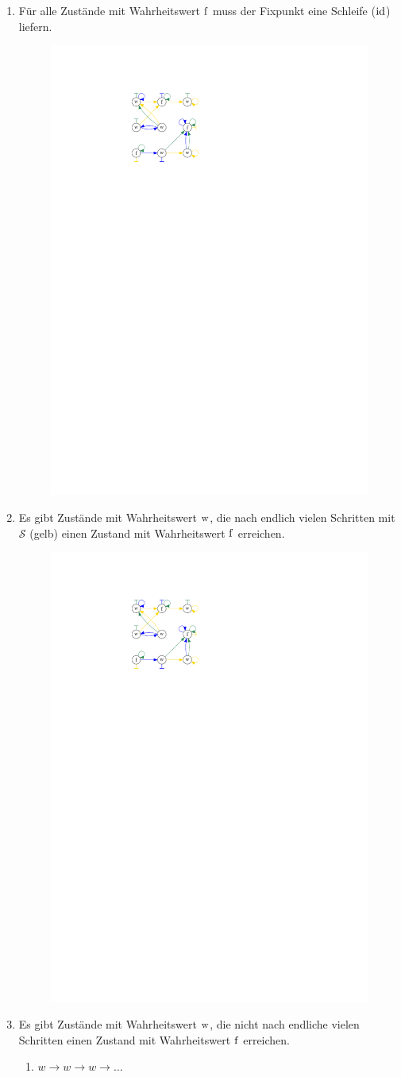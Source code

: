 \begin{enumerate}
    \item Für alle Zustände mit Wahrheitswert $\operatorname{f}$ muss der Fixpunkt eine Schleife ($\operatorname{id}$) liefern.
        \begin{figure}[H]
            \centering
            \includegraphics[page=2,width=.15\textwidth]{img/f-combined}
        \end{figure}
    \item Es gibt Zustände mit Wahrheitswert $\operatorname{w}$, die nach endlich vielen Schritten mit $\mathcal{S}$ (gelb) einen Zustand mit Wahrheitswert $\operatorname{f}$ erreichen.
        \begin{figure}[H]
            \centering
            \includegraphics[page=3,width=.6\textwidth]{img/f-combined}
        \end{figure}
    \item Es gibt Zustände mit Wahrheitswert $\operatorname{w}$, die nicht nach endliche vielen Schritten einen Zustand mit Wahrheitswert $\operatorname{f}$ erreichen.
        \begin{enumerate}
            \item $w \to w \to w \to \dots$
\begin{lstlisting}[language=Pascal]

\end{lstlisting}
\end{enumerate}
\end{enumerate}
